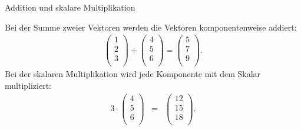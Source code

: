 \documentclass[german]{beamer}
\newcommand{\bq}{\begin{eqnarray*}}
\newcommand{\eq}{\end{eqnarray*}}
\begin{document}
\begin{frame}{Addition und skalare Multiplikation}

Bei der Summe zweier Vektoren werden die Vektoren komponentenweise addiert:
\bq
 \left( \begin{array}{c} 1 \\ 2 \\ 3 \\ \end{array} \right) 
 +
 \left( \begin{array}{c} 4 \\ 5 \\ 6 \\ \end{array} \right) 
 =
 \left( \begin{array}{c} 5 \\ 7 \\ 9 \\ \end{array} \right).
\eq
Bei der skalaren Multiplikation wird jede Komponente mit dem Skalar multipliziert:
\bq
 3 \cdot
 \left( \begin{array}{c} 4 \\ 5 \\ 6 \\ \end{array} \right) 
 & = & 
 \left( \begin{array}{c} 12 \\ 15 \\ 18 \\ \end{array} \right).
\eq

\end{frame}
\end{document}
